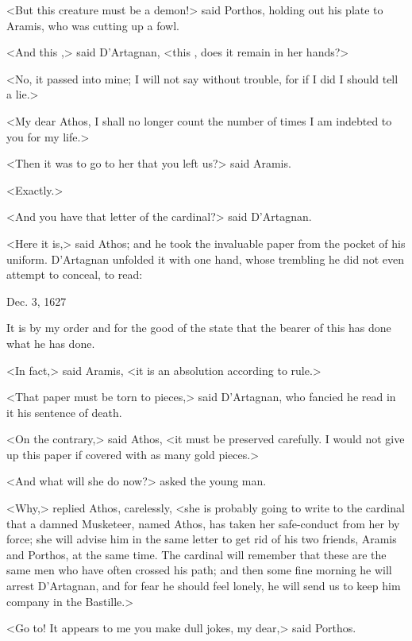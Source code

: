 <But this creature must be a demon!> said Porthos, holding out his plate to Aramis, who was cutting up a fowl. 

<And this ,> said D'Artagnan, <this , does it remain in her hands?> 

<No, it passed into mine; I will not say without trouble, for if I did I should tell a lie.> 

<My dear Athos, I shall no longer count the number of times I am indebted to you for my life.> 

<Then it was to go to her that you left us?> said Aramis. 

<Exactly.> 

<And you have that letter of the cardinal?> said D'Artagnan. 

<Here it is,> said Athos; and he took the invaluable paper from the pocket of his uniform. D'Artagnan unfolded it with one hand, whose trembling he did not even attempt to conceal, to read: 

\begin{mail}{Dec. 3, 1627}

It is by my order and for the good of the state that the bearer of this has done what he has done.

\end{mail}

<In fact,> said Aramis, <it is an absolution according to rule.> 

<That paper must be torn to pieces,> said D'Artagnan, who fancied he read in it his sentence of death. 

<On the contrary,> said Athos, <it must be preserved carefully. I would not give up this paper if covered with as many gold pieces.> 

<And what will she do now?> asked the young man. 

<Why,> replied Athos, carelessly, <she is probably going to write to the cardinal that a damned Musketeer, named Athos, has taken her safe-conduct from her by force; she will advise him in the same letter to get rid of his two friends, Aramis and Porthos, at the same time. The cardinal will remember that these are the same men who have often crossed his path; and then some fine morning he will arrest D'Artagnan, and for fear he should feel lonely, he will send us to keep him company in the Bastille.> 

<Go to! It appears to me you make dull jokes, my dear,> said Porthos. 

